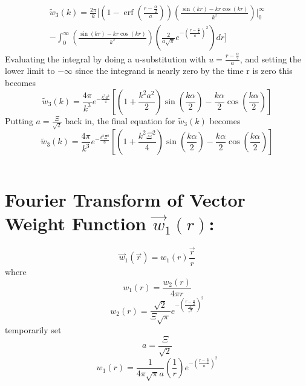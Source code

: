 \documentclass[double,12pt]{beavtex}
\begin{document}
\begin{multline}
  \widetilde{w}_3(k)=\frac{2\pi}{k}\Bigg[\left(1-\operatorname{erf}\left(\frac{r-\frac{\alpha}{2}}{a}\right)\right)\left(\frac{\sin(kr)-kr\cos(kr)}{k^2}\right)\bigg|^{\infty}_0
   \\
  -\int_{0}^{\infty}\left(\frac{\sin(kr)-kr\cos(kr)}{k^2}\right)\left(\frac{2}{a\sqrt{\pi}}e^{-\left(\frac{r-\frac{\alpha}{2}}{a}\right)^2}\right)dr\Bigg]
\end{multline}
Evaluating the integral by doing a u-substitution with $u=\frac{r-\frac{\alpha}{2}}{a}$, and setting the lower limit to $-\infty$  since the integrand is nearly zero by the time r is zero this becomes
\begin{equation}{\widetilde{w}_3(k)=\frac{4\pi}{k^3}e^{-\frac{k^2a^2}{4}}\left[\left(1+\frac{k^2a^2}{2}\right)\sin\left(\frac{k\alpha}{2}\right)-\frac{k\alpha}{2}\cos\left(\frac{k\alpha}{2}\right)\right]}\end{equation}
Putting $a=\frac{\Xi}{\sqrt{2}}$ back in, the final equation for $\widetilde{w}_3(k)$ becomes
\begin{equation}{\widetilde{w}_3(k)=\frac{4\pi}{k^3}e^{-\frac{k^2\Xi^2}{8}}\left[\left(1+\frac{k^2\Xi^2}{4}\right)\sin\left(\frac{k\alpha}{2}\right)-\frac{k\alpha}{2}\cos\left(\frac{k\alpha}{2}\right)\right]}\end{equation}

\[{}\]
\section{Fourier Transform of Vector Weight Function $\vec{w}_{1}(r)$:}
\begin{equation}{\vec{w}_1(\vec{r})=w_1(r)\frac{\vec{r}}{r}}\end{equation}
where
\begin{equation}{w_1(r)=\frac{w_2(r)}{4{\pi}r}}\end{equation}
\begin{equation}{w_2(r)=\frac{\sqrt{2}}{\Xi\sqrt{\pi}}e^{-\left(\frac{r-\frac{\alpha}{2}}{\frac{\Xi}{\sqrt{2}}}\right)^2}}\end{equation}
temporarily set 
\begin{equation}{a=\frac{\Xi}{\sqrt{2}}}\end{equation}
\begin{equation}{w_1(r)=\frac{1}{4{\pi}\sqrt{\pi}a}\left(\frac{1}{r}\right)e^{-\left(\frac{r-\frac{\alpha}{2}}{a}\right)^2}}\end{equation}
\end{document}
